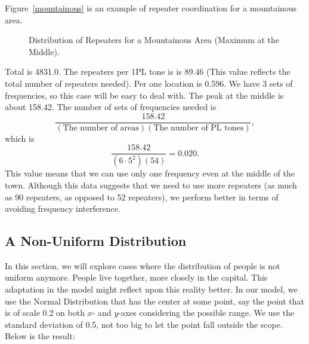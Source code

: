 \documentclass{icmmcm}
\begin{document}
Figure~\ref{mountainous} is an example of repeater coordination for a mountainous area.
\begin{figure}[ht]
\begin{center}
\end{center}
\caption[A Distribution of Repeaters for a Mountainous Area]{Distribution of Repeaters for a Mountainous Area (Maximum at the Middle).\label{mountainous}}
\label{fig:an-eps-graphic}
\end{figure}
Total is 4831.0. The repeaters per 1PL tone is  is 89.46 (This value reflects the total number of repeaters needed). Per one location is 0.596. We have 3 sets of frequencies, so this case will be easy to deal with. The peak at the middle is about 158.42. The number of sets of frequencies needed is 
$$\frac{158.42}{(\text{The number of areas})(\text{The number of PL tones})},$$
which is 
$$\frac{158.42}{(6\cdot 5^2)(54)}=\boxed {0.020.}$$
This value means that we can use only one frequency even at the middle of the town.  Although this data suggests that we need to use more repeaters (as much as 90 repeaters, as opposed to 52 repeaters), we perform better in terms of avoiding frequency interference.

\subsection{A Non-Uniform Distribution}
In this section, we will explore cases where the distribution of people is not uniform anymore. People live together, more closely in the capital. This adaptation in the model might reflect upon this reality better. In our model, we use the Normal Distribution that has the center at some point, say the point that is of scale 0.2 on both $x$- and $y$-axes considering the possible range. We use the standard deviation of 0.5, not too big to let the point fall outside the scope. Below is the result:
\end{document}
